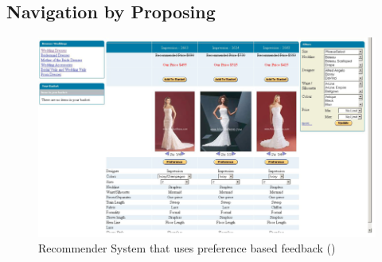 \subsection{Navigation by Proposing}
\begin{figure}
    \includegraphics[width=1.0\textwidth]{figures-bharath/pbf.png}
  \caption{Recommender System that uses preference based feedback (\cite{smyth2007})}
  \centering
\label{fig:pbf2}
\end{figure}

